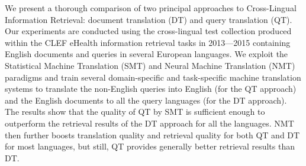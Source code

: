 We present a thorough comparison of two principal approaches to Cross-Lingual Information Retrieval: document translation (DT) and query translation (QT). Our experiments are conducted using the cross-lingual test collection produced within the CLEF eHealth information retrieval tasks in 2013---2015 containing English documents and queries in several European languages. We exploit the Statistical Machine Translation (SMT) and Neural Machine Translation (NMT) paradigms and train several domain-specific and task-specific machine translation systems to translate the non-English queries into English (for the QT approach) and the English documents to all the query languages (for the DT approach). The results show that the quality of QT by SMT is sufficient enough to outperform the retrieval results of the DT approach for all the languages. NMT then further boosts translation quality and retrieval quality for both QT and DT for most languages, but still, QT provides generally better retrieval results than DT.
